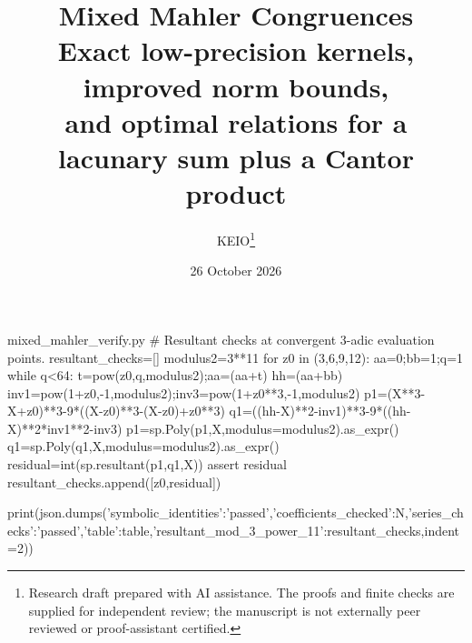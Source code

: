 \begin{filecontents*}[overwrite]{mixed_mahler_verify.py}
# Resultant checks at convergent 3-adic evaluation points.
resultant_checks=[]
modulus2=3**11
for z0 in (3,6,9,12):
    aa=0;bb=1;q=1
    while q<64:
        t=pow(z0,q,modulus2);aa=(aa+t)%
    hh=(aa+bb)%
    inv1=pow(1+z0,-1,modulus2);inv3=pow(1+z0**3,-1,modulus2)
    p1=(X**3-X+z0)**3-9*((X-z0)**3-(X-z0)+z0**3)
    q1=((hh-X)**2-inv1)**3-9*((hh-X)**2*inv1**2-inv3)
    p1=sp.Poly(p1,X,modulus=modulus2).as_expr()
    q1=sp.Poly(q1,X,modulus=modulus2).as_expr()
    residual=int(sp.resultant(p1,q1,X))%
    assert residual%
    resultant_checks.append([z0,residual])

print(json.dumps({'symbolic_identities':'passed','coefficients_checked':N,'series_checks':'passed','table':table,'resultant_mod_3_power_11':resultant_checks},indent=2))
\end{filecontents*}
\documentclass[11pt,a4paper]{article}
\usepackage[T1]{fontenc}
\usepackage[utf8]{inputenc}
\usepackage{lmodern,microtype}
\usepackage[margin=27mm]{geometry}
\usepackage{amsmath,amssymb,amsthm,mathtools}
\usepackage{booktabs,array,enumitem,xcolor}
\usepackage[colorlinks=true,linkcolor=blue!45!black,citecolor=blue!45!black,urlcolor=blue!45!black]{hyperref}
\usepackage{fancyhdr}
\pagestyle{fancy}\fancyhf{}
\fancyfoot[C]{\thepage}
\setlength{\headheight}{14pt}
\setlength{\parskip}{3pt}
\setlength{\parindent}{1.2em}
\newtheorem{theorem}{Theorem}[section]
\newtheorem{lemma}[theorem]{Lemma}
\newtheorem{proposition}[theorem]{Proposition}
\newtheorem{corollary}[theorem]{Corollary}
\theoremstyle{definition}
\newtheorem{definition}[theorem]{Definition}
\newtheorem{question}[theorem]{Question}
\theoremstyle{remark}
\newtheorem{remark}[theorem]{Remark}
\newcommand{\Z}{\mathbb Z}
\newcommand{\Q}{\mathbb Q}
\newcommand{\C}{\mathbb C}
\newcommand{\F}{\mathbb F}
\newcommand{\A}{\Phi_3}
\newcommand{\B}{\Psi}
\newcommand{\val}{\nu_3}
\DeclareMathOperator{\Res}{Res}
\DeclareMathOperator{\Gal}{Gal}
\DeclareMathOperator{\trdeg}{trdeg}
\DeclareMathOperator{\ord}{ord}
\DeclareMathOperator{\Frac}{Frac}
\title{Mixed Mahler Congruences\\[3pt]
\large Exact low-precision kernels, improved norm bounds,\\
and optimal relations for a lacunary sum plus a Cantor product}
\author{KEIO\thanks{Research draft prepared with AI assistance. The proofs and finite checks are supplied for independent review; the manuscript is not externally peer reviewed or proof-assistant certified.}}
\date{26 October 2026}

